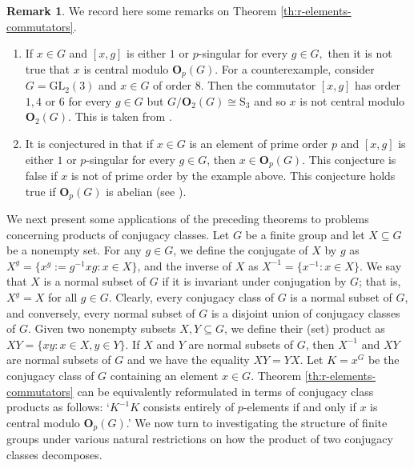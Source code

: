 \documentclass[twoside,a4paper,reqno,12pt]{amsart}
\newcommand{\<}{\langle}
\renewcommand{\>}{\rangle}
\newcommand{\OB}{\mathbf{O}}
\newcommand{\GL}{\mathrm {GL}}
\newcommand{\SSS}{\mathrm {S}}
\renewcommand{\:}{\colon}
\theoremstyle{definition}
\newtheorem{rem}[thm]{Remark}
\begin{document}
 
\begin{rem}\label{rem1} We record here some remarks on Theorem \ref{th:r-elements-commutators}.
\begin{enumerate}
\item[(i)] If  $x\in G$ and $[x,g]$ is either $1$ or $p$-singular for every $g\in G,$ then it is not true that $x$ is central modulo $\OB_p(G)$. For a counterexample, consider $G=\GL_2(3)$ and $x\in G$ of order $8$. Then the commutator $[x,g]$ has order $1,4$ or $6$ for every $g\in G$ but $G/\OB_2(G)\cong\SSS_3$ and so $x$ is not central modulo $\OB_2(G)$.  This is taken from \cite{GTT}.

\item[(ii)]   It is conjectured in \cite{GR,GTT} that if $x\in G$ is an element of prime order $p$  and $[x,g]$ is either $1$ or $p$-singular for every $g\in G$, then $x\in \OB_p(G)$. This conjecture is false if $x$ is not of prime order by the  example above. This conjecture holds true if $\OB_p(G)$ is abelian (see \cite[Theorem 6.2]{GTT}).  

\end{enumerate}
\end{rem}


We next present some applications of the preceding theorems to problems concerning products of conjugacy classes. 
 Let $G$ be a finite group and let $X\subseteq G$ be a nonempty set. For any $g\in G$, we define the conjugate of $X$ by $g$ as 
 $X^g=\{x^g:=g^{-1}xg:x\in X\}$, and the inverse of $X$ as  $X^{-1}=\{x^{-1}:x\in X\}$. We say that $X$ is a normal subset of $G$ if it is invariant under conjugation by $G$; that is, $X^g=X$ for all $g\in G.$ Clearly, every conjugacy class of $G$ is a normal subset of $G$, and conversely,  every normal subset of $G$ is a disjoint union of conjugacy classes of $G$. Given two nonempty subsets $X,Y\subseteq G$, we define their (set) product as $XY=\{xy:x\in X,y\in Y\}$. If $X$ and $Y$ are normal subsets of $G$, then  $X^{-1}$ and $XY$ are normal subsets of $G$ and we have the equality $XY=YX$. Let $K=x^G$ be the conjugacy class of $G$ containing an element $x\in G$.  Theorem \ref{th:r-elements-commutators} can be equivalently reformulated in terms of conjugacy class products as follows: `$K^{-1}K$ consists entirely of $p$-elements if and only if $x$ is central modulo $\OB_p(G)$.' We now turn to investigating the structure of finite groups under various natural restrictions on how the product of two conjugacy classes decomposes.
 
\end{document}
